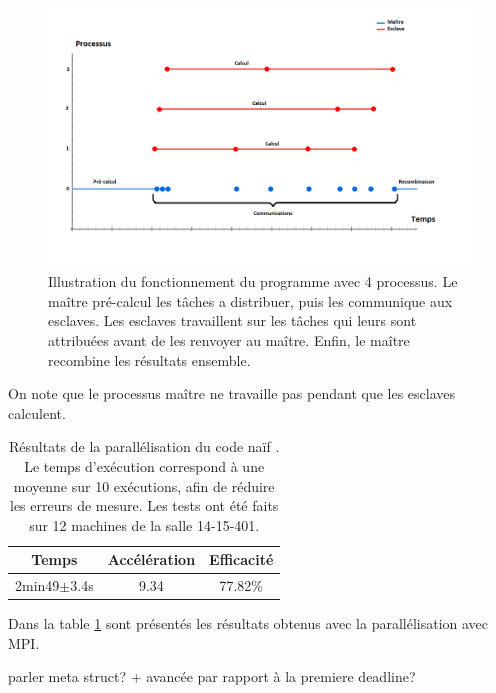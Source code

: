 \documentclass[12pt]{article}
\begin{document}
    \begin{figure} \begin{center}
        \includegraphics[scale=0.33]{figures/time}
        \caption{\label{fig:time}Illustration du fonctionnement du programme
        avec 4 processus. Le maître pré-calcul les tâches a distribuer,
        puis les communique aux esclaves. Les esclaves travaillent sur les
        tâches qui leurs sont attribuées avant de les renvoyer au maître.
        Enfin, le maître recombine les résultats ensemble.}
    \end{center} \end{figure}
    On note que le processus maître ne travaille pas pendant que les esclaves
    calculent.\\
    \begin{table} \begin{center}
        \begin{tabular}{|c|c|c|}
            \hline
            \textbf{Temps}      &   \textbf{Accélération}   &   \textbf{Efficacité} \\ \hline
            2min49$\pm$3.4s      &   9.34                   &   77.82\% \\ \hline
        \end{tabular}
        \caption{\label{tab:mpi1}Résultats de la parallélisation du code \og naïf \fg. Le temps
        d'exécution correspond à une moyenne sur 10 exécutions, afin de réduire les erreurs de
        mesure. Les tests ont été faits sur 12 machines de la salle 14-15-401.}
    \end{center} \end{table}
    \par Dans la table \ref{tab:mpi1} sont présentés les résultats obtenus avec
    la parallélisation avec MPI.
    \par {\color{red}parler meta struct?
    + avancée par rapport à la premiere deadline?}
\end{document}
